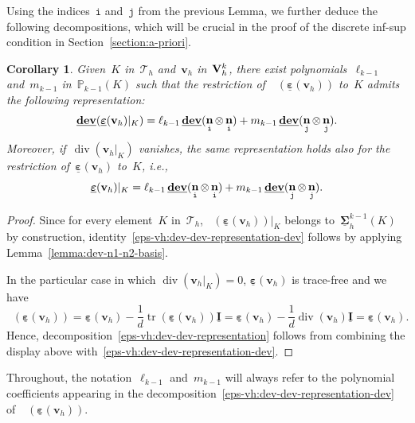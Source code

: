 \documentclass[a4paper,twoside,10pt]{article}
\theoremstyle{plain}
\newtheorem{corollary}[theorem]{Corollary}
\theoremstyle{remark}
\theoremstyle{definition}
\numberwithin{equation}{section}
\numberwithin{figure}{section}
\newcommand{\Pbbkmo}{\mathbb{P}_{k-1}}
\newcommand{\Tauh}{\mathcal{T}_h}
\newcommand{\K}{K}
\newcommand{\Sigmah}{\underline{\boldsymbol{\Sigma}}_h}
\newcommand{\Sigmahkmo}{\Sigmah^{k-1}}
\newcommand{\Vh}{{\bf{V}}_h}
\newcommand{\Vhk}{\Vh^k}
\newcommand{\vbfh}{\mathbf{v}_h}
\DeclareMathOperator{\dive}{div}
\DeclareMathOperator{\dev}{\underline{\mathbf{dev}}}
\DeclareMathOperator{\tr}{tr}
\DeclareMathOperator{\norm}{\bf{n}}
\newcommand{\epsbfun}{\underline{\boldsymbol{\varepsilon}}}
\newcommand{\lkmo}{\ell_{k-1}}
\newcommand{\mkmo}{m_{k-1}}
\newcommand{\itt}{\mathtt{i}}
\newcommand{\jtt}{\mathtt{j}}
\newcommand{\normitt}{\norm_{\itt}}
\newcommand{\normjtt}{\norm_{\jtt}}
\newcommand{\Idbf}{\underline{\mathbf{I}}}
\begin{document}
Using the indices~$\itt$ and~$\jtt$
from the previous Lemma,
we further deduce the following decompositions,
which will be crucial
in the proof of the discrete inf-sup condition
in Section~\ref{section:a-priori}.

\begin{corollary} \label{corollary:decomposition-epsvh}
Given~$\K$ in~$\Tauh$
and~$\vbfh$ in~$\Vhk$,
there exist polynomials~$\lkmo$ and~$\mkmo$ in~$\Pbbkmo(\K)$
such that the restriction of~$\dev(\epsbfun(\vbfh))$ to~$\K$
admits the following representation:
\begin{equation} \label{eps-vh:dev-dev-representation-dev}
\dev(\epsbfun(\vbfh)|_{\K}) = \lkmo \dev(\normitt\otimes\normitt) + \mkmo \dev(\normjtt\otimes\normjtt).
\end{equation}
Moreover,
if~$\dive(\vbfh|_{\K})$ vanishes,
the same representation holds also for the restriction of~$\epsbfun(\vbfh)$ to~$\K$, i.e.,
\begin{equation} \label{eps-vh:dev-dev-representation}
\epsbfun(\vbfh)|_{\K} = \lkmo \dev(\normitt\otimes\normitt) + \mkmo \dev(\normjtt\otimes\normjtt).
\end{equation}
\end{corollary}
\begin{proof}
Since for every element~$\K$ in~$\Tauh$,
$\dev(\epsbfun(\vbfh))|_{\K}$
belongs to~$\Sigmahkmo(\K)$ by construction,
identity~\eqref{eps-vh:dev-dev-representation-dev} follows by applying Lemma~\ref{lemma:dev-n1-n2-basis}.

In the particular case in which $\dive(\vbfh|_{\K}) = 0$,
$\epsbfun(\vbfh)$ is trace-free and
we have
\begin{equation} \label{deveps-equal-eps}
\dev(\epsbfun(\vbfh))
= \epsbfun(\vbfh) - \frac{1}{d}\tr(\epsbfun(\vbfh)) \Idbf 
= \epsbfun(\vbfh) - \frac{1}{d}\dive(\vbfh) \Idbf 
= \epsbfun(\vbfh).
\end{equation}
Hence,
decomposition~\eqref{eps-vh:dev-dev-representation}
follows from combining the display above with~\eqref{eps-vh:dev-dev-representation-dev}.
\end{proof}

Throughout,
the notation~$\lkmo$ and~$\mkmo$
will always refer to the polynomial coefficients
appearing
in the decomposition~\eqref{eps-vh:dev-dev-representation-dev} of~$\dev(\epsbfun(\vbfh))$.



\end{document}
